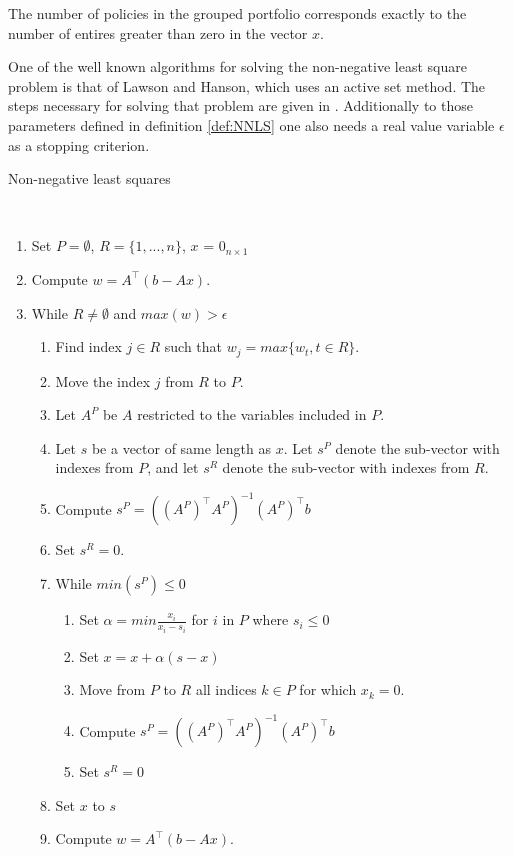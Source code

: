 \begin{remark}
	The number of policies in the grouped portfolio corresponds exactly to the number of entires greater than zero in the vector $x$.
\end{remark}

One of the well known algorithms for solving the non-negative least square problem is that of Lawson and Hanson, which uses an active set method. The steps necessary for solving that problem are given in \cite{lawson}. Additionally to those parameters defined in definition \ref{def:NNLS} one also needs a real value variable $\epsilon$ as a stopping criterion.

\begin{algorithm}
	\caption{Non-negative least squares \cite{lawson}}\label{alg:NNLS}
	\begin{algorithmic}
		\\
		\begin{enumerate}
			\item Set $P = \emptyset$, $R = \{1, ..., n\}$, $x$ = $0_{n \times 1}$
			\item Compute $w = A^\top(b - Ax)$.
			\item While $R \neq \emptyset$ and $max(w) > \epsilon$
			\begin{enumerate}[label=\emph{\alph*})]
				\item Find index $j \in R$ such that $w_j = max\{w_t, t \in R\}$.
				\item Move the index $j$ from $R$ to $P$.
				\item Let $A^P$ be $A$ restricted to the variables included in $P$.
				\item Let $s$ be a vector of same length as $x$. Let $s^P$ denote the sub-vector with indexes from $P$, and let $s^R$ denote the sub-vector with indexes from $R$.
				\item Compute $s^P = ((A^P)^\top A^P)^{-1} (A^P)^\top b$
				\item Set $s^R = 0$.
				\item While $min(s^P) \leq 0$
				\begin{enumerate}
					\item Set $\alpha = min\frac{x_i}{x_i - s_i}$ for $i$ in $P$ where $s_i \leq 0$
					\item Set $x = x + \alpha(s-x)$
					\item Move from $P$ to $R$ all indices $k \in P$ for which $x_k = 0$.
					\item Compute $s^P = ((A^P)^\top A^P)^{-1} (A^P)^\top b$
					\item Set $s^R = 0$
				\end{enumerate}
				\item Set $x$ to $s$
				\item Compute $w = A^\top(b - Ax)$.
			\end{enumerate}
		\end{enumerate}
	\end{algorithmic}
\end{algorithm}

